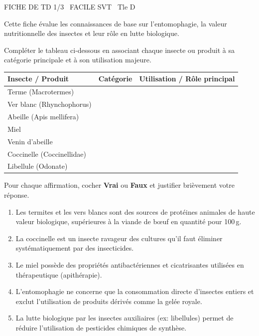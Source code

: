 \documentclass[11pt]{article}
\begin{document}
\begin{tcolorbox}[enhanced,colback=popink,colframe=popink,arc=10pt,boxrule=0pt,left=12pt,right=12pt,top=9pt,bottom=9pt]
{\color{white}\popxbold\small FICHE DE TD 1/3 \textbullet\ FACILE \hfill SVT \textbullet\ Tle D\par}
\end{tcolorbox}
\vspace{4pt}
Cette fiche évalue les connaissances de base sur l'entomophagie, la valeur nutritionnelle des insectes et leur rôle en lutte biologique.

\begin{exercice}
Compléter le tableau ci-dessous en associant chaque insecte ou produit à sa catégorie principale et à son utilisation majeure.

\begin{tabularx}{\linewidth}{|X|X|X|}
\hline
\textbf{Insecte / Produit} & \textbf{Catégorie} & \textbf{Utilisation / Rôle principal} \\
\hline
Terme (Macrotermes) & & \\
\hline
Ver blanc (Rhynchophorus) & & \\
\hline
Abeille (Apis mellifera) & & \\
\hline
Miel & & \\
\hline
Venin d'abeille & & \\
\hline
Coccinelle (Coccinellidae) & & \\
\hline
Libellule (Odonate) & & \\
\hline
\end{tabularx}
\end{exercice}

\begin{exercice}
Pour chaque affirmation, cocher \textbf{Vrai} ou \textbf{Faux} et justifier brièvement votre réponse.
\begin{enumerate}[label=\arabic*.]
\item Les termites et les vers blancs sont des sources de protéines animales de haute valeur biologique, supérieures à la viande de bœuf en quantité pour 100\,g.
\item La coccinelle est un insecte ravageur des cultures qu'il faut éliminer systématiquement par des insecticides.
\item Le miel possède des propriétés antibactériennes et cicatrisantes utilisées en thérapeutique (apithérapie).
\item L'entomophagie ne concerne que la consommation directe d'insectes entiers et exclut l'utilisation de produits dérivés comme la gelée royale.
\item La lutte biologique par les insectes auxiliaires (ex: libellules) permet de réduire l'utilisation de pesticides chimiques de synthèse.
\end{enumerate}
\end{exercice}
\end{document}
